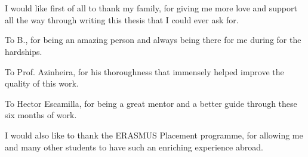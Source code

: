 
\section*{\acknowledgments}

{\setlength{\parindent}{0cm}
I would like first of all to thank my family, for giving me more love and support all the way through writing this thesis that I could ever ask for.


To B., for being an amazing person and always being there for me during for the hardships.


To Prof. Azinheira, for his thoroughness that immensely helped improve the quality of this work.

To Hector Escamilla, for being a great mentor and a better guide through these six months of work.

I would also like to thank the ERASMUS Placement programme, for allowing me and many other students to have such an enriching experience abroad.}

